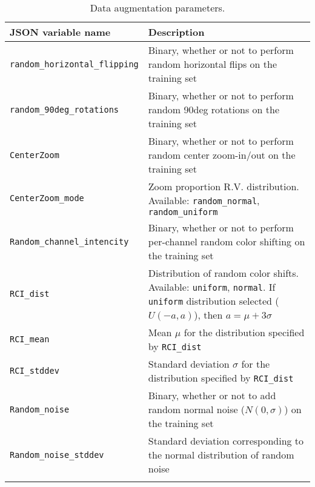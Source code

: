 \setlength{\mylinewidth}{\linewidth-7pt}%
\setlength{\mylengtha}{0.4\mylinewidth-2\arraycolsep}%
\setlength{\mylengthb}{0.6\mylinewidth-2\arraycolsep}%

\begin{longtable}{>{\centering\arraybackslash}m{\mylengtha} | m{\mylengthb}}
    \hline
    JSON variable name & Description \\
    \hline
    \texttt{random\_horizontal\_flipping} & Binary, whether or not to perform random horizontal flips on the training set \\
    \hline
    \texttt{random\_90deg\_rotations} & Binary, whether or not to perform random 90deg rotations on the training set \\
    \hline
    \texttt{CenterZoom} & Binary, whether or not to perform random center zoom-in/out on the training set \\
    \hline
    \texttt{CenterZoom\_mode} & Zoom proportion R.V. distribution. Available: \texttt{random\_normal}, \texttt{random\_uniform} \\
    \hline
    \texttt{Random\_channel\_intencity} & Binary, whether or not to perform per-channel random color shifting on the training set \\
    \hline
    \texttt{RCI\_dist} & Distribution of random color shifts. Available: \texttt{uniform}, \texttt{normal}. If \texttt{uniform} distribution selected ($U(-a, a)$), then $a=\mu+3\sigma$ \\
    \hline
    \texttt{RCI\_mean} & Mean $\mu$ for the distribution specified by \texttt{RCI\_dist} \\
    \hline
    \texttt{RCI\_stddev} & Standard deviation $\sigma$ for the distribution specified by \texttt{RCI\_dist} \\
    \hline
    \texttt{Random\_noise} & Binary, whether or not to add random normal noise ($N(0, \sigma)$) on the training set \\
    \hline
    \texttt{Random\_noise\_stddev} & Standard deviation corresponding to the normal distribution of random noise \\
    \hline
  \caption{Data augmentation parameters.}
  \label{table:model_train_in:params_da}
\end{longtable}
